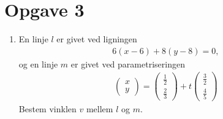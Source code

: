 \section*{Opgave 3}
\begin{enumerate}[label=\roman*)]
	\item En linje $l$ er givet ved ligningen
	\begin{align*}
		6(x-6) + 8(y-8) = 0,
	\end{align*}
	og en linje $m$ er givet ved parametriseringen
	\begin{align*}
		\begin{pmatrix}
			x \\ y
		\end{pmatrix} = 
		\begin{pmatrix}
			\frac{1}{2} \\ \frac{2}{3}
		\end{pmatrix} + t
		\begin{pmatrix}
			\frac{3}{2} \\ \frac{4}{5}
		\end{pmatrix}
	\end{align*}
	Bestem vinklen $v$ mellem $l$ og $m$. 
\end{enumerate}
